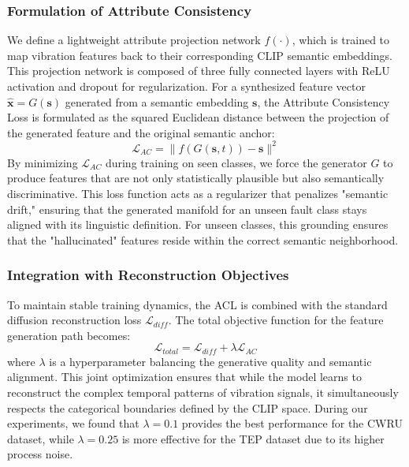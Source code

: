 \subsubsection{Formulation of Attribute Consistency}
We define a lightweight attribute projection network $f(\cdot)$, which is trained to map vibration features back to their corresponding CLIP semantic embeddings. This projection network is composed of three fully connected layers with ReLU activation and dropout for regularization. For a synthesized feature vector $\hat{\mathbf{x}} = G(\mathbf{s})$ generated from a semantic embedding $\mathbf{s}$, the Attribute Consistency Loss is formulated as the squared Euclidean distance between the projection of the generated feature and the original semantic anchor:
\begin{equation}
\mathcal{L}_{AC} = \| f(G(\mathbf{s}, t)) - \mathbf{s} \|^2
\end{equation}
By minimizing $\mathcal{L}_{AC}$ during training on seen classes, we force the generator $G$ to produce features that are not only statistically plausible but also semantically discriminative. This loss function acts as a regularizer that penalizes "semantic drift," ensuring that the generated manifold for an unseen fault class stays aligned with its linguistic definition. For unseen classes, this grounding ensures that the "hallucinated" features reside within the correct semantic neighborhood.

\subsubsection{Integration with Reconstruction Objectives}
To maintain stable training dynamics, the ACL is combined with the standard diffusion reconstruction loss $\mathcal{L}_{diff}$. The total objective function for the feature generation path becomes:
\begin{equation}
\mathcal{L}_{total} = \mathcal{L}_{diff} + \lambda \mathcal{L}_{AC}
\end{equation}
where $\lambda$ is a hyperparameter balancing the generative quality and semantic alignment. This joint optimization ensures that while the model learns to reconstruct the complex temporal patterns of vibration signals, it simultaneously respects the categorical boundaries defined by the CLIP space. During our experiments, we found that $\lambda=0.1$ provides the best performance for the CWRU dataset, while $\lambda=0.25$ is more effective for the TEP dataset due to its higher process noise.

